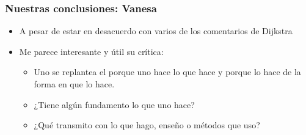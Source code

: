 \documentclass[ignorenonframetext,]{beamer}
\begin{document}
\begin{frame}\frametitle{Nuestras conclusiones: Vanesa}

\begin{itemize}[<+->]
\itemsep1pt\parskip0pt
\item
  A pesar de estar en desacuerdo con varios de los comentarios de
  Dijkstra
\item
  Me parece interesante y útil su crítica:

  \begin{itemize}[<+->]
  \itemsep1pt\parskip0pt
  \item
    Uno se replantea el porque uno hace lo que hace y porque lo hace de
    la forma en que lo hace.
  \item
    ¿Tiene algún fundamento lo que uno hace?
  \item
    ¿Qué transmito con lo que hago, enseño o métodos que uso?
  \end{itemize}
\end{itemize}

\end{frame}
\end{document}
